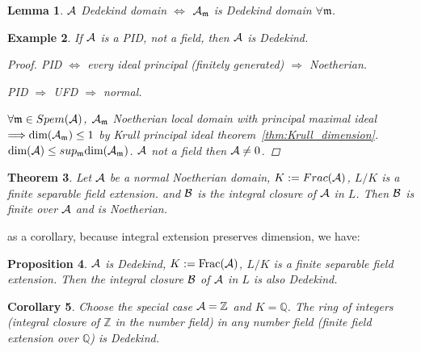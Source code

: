 \documentclass[11pt]{article}
\newtheorem{thm}{Theorem}[section]
\newtheorem{prop}[thm]{Proposition}
\newtheorem{lemma}[thm]{Lemma}
\newtheorem{cor}[thm]{Corollary}
\newtheorem{ex}[thm]{Example}
\newcommand{\intg}{\mathbb Z}
\newcommand{\ratl}{\mathbb Q}
\newcommand{\scm}{{\mathfrak m}}
\newcommand{\cala}{{\cal A}}
\newcommand{\calb}{{\cal B}}
\newcommand{\Lrta}{\Longrightarrow}
\newcommand{\Llrta}{\Longleftrightarrow}
\begin{document}
\begin{lemma}
$\cala$ Dedekind domain $\Llrta $ $\cala_\scm$ is Dedekind domain $\forall\scm$.
\end{lemma}


\begin{ex}
If $\cala$ is a PID, not a field, then $\cala$ is Dedekind.
\begin{proof}
PID $\Llrta$ every ideal principal (finitely generated) $\Lrta $ Noetherian.

PID $\Lrta $ UFD $\Lrta$ normal.

$\forall\scm\in Spem(\cala)$, $\cala_\scm$ Noetherian local domain with principal maximal ideal $\Lrta \text{dim}(\cala_\scm)\leq 1$ by Krull principal ideal theorem~\ref{thm:Krull_dimension}.\\
$\text{dim}(\cala)\leq sup_\scm \text{dim}(\cala_\scm)$. $\cala$ not a field then $\cala\neq 0$. 
\end{proof}
\end{ex}

\begin{thm}\label{thm:finitness_integral_closure}
Let $\cala$ be a normal Noetherian domain, $K:=Frac(\cala)$, $L/K$ is a finite separable field extension. and $\calb$ is the integral closure of $\cala$ in $L$. Then $\calb$ is finite over $\cala$ and is Noetherian.
\end{thm}
as a corollary, because integral extension preserves dimension, we have:
\begin{prop}
$\cala$ is Dedekind, $K:=\text{Frac}(\cala)$, $L/K$ is a finite separable field extension. Then the integral closure $\calb$ of $\cala$ in $L$ is also Dedekind.
\end{prop}

\begin{cor} Choose the special case $\cala=\intg$ and $K=\ratl$.
The ring of integers (integral closure of $\intg$ in the number field) in any number field (finite field extension over $\ratl$) is Dedekind. 
\end{cor}
\end{document}

